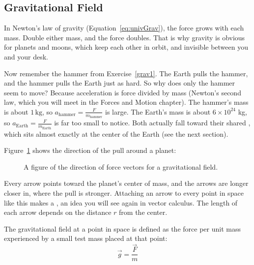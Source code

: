 \subsection{Gravitational Field}
In Newton's law of gravity (Equation~\ref{eq:univGrav}), the force grows with each mass. Double either mass, and the force doubles. That is why gravity is obvious for planets and moons, which keep each other in orbit, and invisible between you and your desk.

Now remember the hammer from Exercise~\ref{grav1}. The Earth pulls the hammer, and the hammer pulls the Earth just as hard. So why does only the hammer seem to move? Because acceleration is force divided by mass (Newton's second law, which you will meet in the Forces and Motion chapter). The hammer's mass is about $1 \, \mathrm{kg}$, so $a_\text{hammer} = \frac{F}{m_\text{hammer}}$ is large. The Earth's mass is about $6 \times 10^{24}$ kg, so $a_\text{Earth} = \frac{F}{m_\text{Earth}}$ is far too small to notice. Both actually fall toward their shared , which sits almost exactly at the center of the Earth (see the next section).

Figure~\ref{fig:grav_field} shows the direction of the pull around a planet:

\begin{figure}[H]
\centering
  \caption{A figure of the direction of force vectors for a gravitational field.}
  \label{fig:grav_field}
\end{figure}

Every arrow points toward the planet's center of mass, and the arrows are longer closer in, where the pull is stronger. Attaching an arrow to every point in space like this makes a , an idea you will see again in vector calculus. The length of each arrow depends on the distance $r$ from the center.

  The gravitational field at a point in space is defined as the force per unit mass experienced by a small test mass placed at that point:
  $$\vec g = \frac{\vec F}{m}$$

